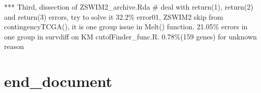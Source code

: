 \documentclass[preprint,12pt]{elsarticle}
\newenvironment{MyColorPar}[1]{%
    \leavevmode\color{#1}\ignorespaces%
}{%
}%
\begin{document}
\begin{MyColorPar}{blue}
\begin{MyColorPar}{red}
***
Third, dissection of ZSWIM2\_archive.Rda %
# deal with return(1), return(2) and return(3) errors, try to solve it
32.2\% error01, ZSWIM2 skip from contingencyTCGA(), it is one group issue in Melt() function.
21.05\% errors in  one group in survdiff on KM cutofFinder_func.R.
0.78\%(159 genes) for unknown reason


\end{MyColorPar} %


\end{MyColorPar} %







%



\section{end_document}
\end{document}
